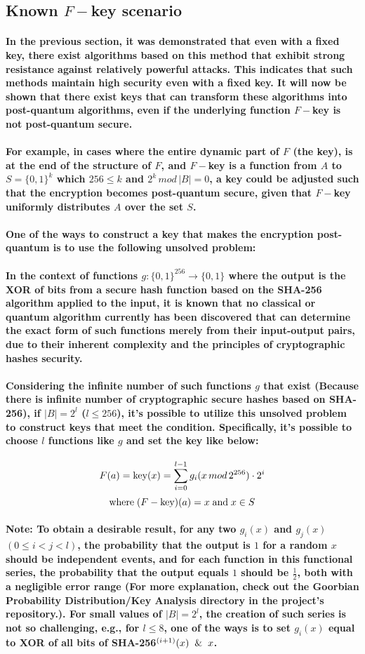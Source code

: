 \documentclass[oneside]{book}
\newcommand{\myparagraph}[1]{\paragraph{\textnormal{#1}}}
\begin{document}
\newpage

\subsection{Known $F-$key scenario}

\myparagraph{
In the previous section, it was demonstrated that even with a fixed key, there exist algorithms based on this method that exhibit strong resistance against relatively powerful attacks. This indicates that such methods maintain high security even with a fixed key. It will now be shown that there exist keys that can transform these algorithms into post-quantum algorithms, even if the underlying function $F-$key is not post-quantum secure.
}

\myparagraph{
For example, in cases where the entire dynamic part of $F$ (the key), is at the end of the structure of $F$, and $F-$key is a function from $A$ to $S = \{0, 1\}^k$ which $256 \le k$ and $2^k \, mod \, |B| = 0$, a key could be adjusted such that the encryption becomes post-quantum secure, given that $F-$key uniformly distributes $A$ over the set $S$.
}

\myparagraph{
\textbf{One of the ways to construct a key that makes the encryption post-quantum is to use the following unsolved problem:}
}

\myparagraph{
In the context of functions $g: \{0, 1\}^{256} \rightarrow \{0, 1\}$ where the output is the XOR of bits from a secure hash function based on the SHA-256 algorithm applied to the input, it is known that no classical or quantum algorithm currently has been discovered that can determine the exact form of such functions merely from their input-output pairs, due to their inherent complexity and the principles of cryptographic hashes security.
}

\myparagraph{
Considering the infinite number of such functions $g$ that exist (Because there is infinite number of cryptographic secure hashes based on SHA-256), if $|B| = 2 ^ l$ ($l \le 256$), it's possible to utilize this unsolved problem to construct keys that meet the condition. Specifically, it's possible to choose $l$ functions like $g$ and set the key like below:
}

$$F(a) = \textnormal{key}(x) = \sum_{i=0}^{l-1} g_i(x\, mod \, 2^{256}) \cdot 2 ^ i $$
$$ \text{where} \; (F - \text{key})(a) = x \; \textnormal{and} \; x \in S$$

\myparagraph{
\textbf{Note:} To obtain a desirable result, for any two $g_i(x)$ and $g_j(x)$ $(0 \le i  < j < l)$, the probability that the output is $1$ for a random $x$ should be independent events, and for each function in this functional series, the probability that the output equals $1$ should be $\frac{1}{2}$, both with a negligible error range (For more explanation, check out the \textbf{Goorbian Probability Distribution/Key Analysis} directory in the project's repository.). For small values of $|B| = 2^l$, the creation of such series is not so challenging, e.g., for $l \le 8$, one of the ways is to set $g_i(x)$ equal to XOR of all bits of SHA-256$^{(i+1)}(x) \And x$.
}
\end{document}
